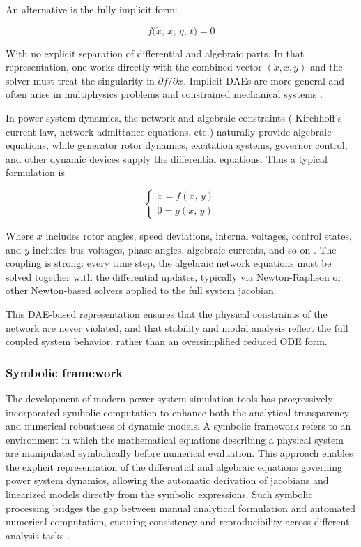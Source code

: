 An alternative is the fully implicit form:  

\begin{equation}
f\bigl(\dot{x},\, x,\, y,\, t \bigr) = 0
\end{equation}

With no explicit separation of differential and algebraic parts. In that representation, one works directly with the combined vector $(\dot{x}, x, y)$ and the solver must treat 
the singularity in $\partial f / \partial \dot{x}$. Implicit DAEs are more general and often arise in multiphysics problems and constrained mechanical systems \cite{CasellaDAE}.  

 
In power system dynamics, the network and algebraic constraints ( Kirchhoff's current law, network admittance equations, etc.) naturally provide algebraic equations, 
while generator rotor dynamics, excitation systems, governor control, and other dynamic devices supply the differential equations. Thus a typical formulation is  

\begin{equation}
\begin{cases}
\dot{x} = f(x,\, y) \\
0 = g(x,\, y)
\end{cases}
\end{equation}

Where $x$ includes rotor angles, speed deviations, internal voltages, control states, and $y$ includes bus voltages, phase angles, algebraic currents, and so on \cite{SauerPaiBook}. 
The coupling is strong: every time step, the algebraic network equations must be solved together with the differential updates, typically via Newton-Raphson or other Newton-based 
solvers applied to the full system jacobian.   

This DAE-based representation ensures that the physical constraints of the network are never violated, and that stability and modal analysis reflect the full coupled system behavior,
rather than an oversimplified reduced ODE form.  

\subsubsection{Symbolic framework}

The development of modern power system simulation tools has progressively incorporated symbolic computation to enhance both the analytical transparency and numerical
robustness of dynamic models. A symbolic framework refers to an environment in which the mathematical equations describing a physical system are manipulated symbolically
before numerical evaluation. This approach enables the explicit representation of the differential and algebraic equations governing power system dynamics, allowing the 
automatic derivation of jacobians and linearized models directly from the symbolic expressions.
Such symbolic processing bridges the gap between manual analytical formulation and automated numerical computation, ensuring consistency and reproducibility across 
different analysis tasks \cite{SymbolicHantao}.

